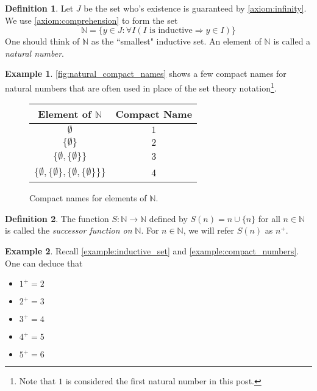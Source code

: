 \documentclass{article}
\theoremstyle{definition}
\newtheorem{definition}{Definition}[section]
\theoremstyle{definition}
\newtheorem{example}{Example}[section]
\theoremstyle{plain}
\theoremstyle{remark}
\theoremstyle{plain}
\theoremstyle{remark}
\theoremstyle{plain}
\theoremstyle{plain}
\theoremstyle{plain}
\begin{document}
\begin{definition}
  Let \( J \) be the set who's existence is guaranteed by 
  \autoref{axiom:infinity}. We use \autoref{axiom:comprehension} to form the set 
  \[ 
    \mathbb{N} 
    = 
    \{y \in J : \forall I ( I \text{ is inductive} \Rightarrow y \in I )\}
  \] 
  One should think of \( \mathbb{N} \) as the ``smallest" inductive set. An 
  element of \( \mathbb{N} \) is called a \textit{natural number}.
\end{definition}

\begin{example}
  \autoref{fig:natural_compact_names} shows a few compact names for natural 
  numbers that are often used in place of the set theory 
  notation\footnote{Note that \( 1 \) is considered the first natural number in 
  this post.}.
  \label{example:compact_numbers}
\end{example}

\begin{figure}[h]
    \centering
    \begin{tabular}{ c | c }
      Element of \(\mathbb{N}\)  & Compact Name  \\
      \hline
      \(\emptyset\)                                                        & \(1\) \\
      \(\{\emptyset\}\)                                                    & \( 2 \) \\ 
      \(\{\emptyset, \{\emptyset\}\}\)                                     & \(3\) \\
      \(\{ \emptyset, \{\emptyset\}, \{\emptyset, \{ \emptyset \} \} \} \) & 4 
    \end{tabular} 
    \caption{Compact names for elements of \( \mathbb{N}\).}
    \label{fig:natural_compact_names}
\end{figure}

\begin{definition}
  The function \( S: \mathbb{N} \rightarrow \mathbb{N} \) defined by 
  \( S(n) = n \cup \{n\} \) for all \( n \in \mathbb{N} \) is called the 
  \textit{successor function on} \( \mathbb{N} \). For \( n \in \mathbb{N} \), 
  we will refer \( S(n) \) as \( n^{+} \).
\end{definition}

\begin{example}
  Recall \autoref{example:inductive_set} and \autoref{example:compact_numbers}. 
  One can deduce that 
  \begin{itemize}
    \item \(1^{+} = 2 \)
    \item \(2^{+} = 3\)
    \item \(3^{+} = 4\)
    \item \(4^{+} = 5\)
    \item \(5^{+} = 6\)
  \end{itemize}
  \label{example:successor}
\end{example}
\end{document}
